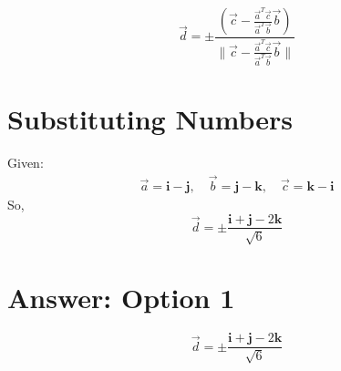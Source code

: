 \documentclass[14pt]{extarticle}
\begin{document}
\begin{equation}
    \vec{d} = \pm \frac{(\vec{c} - \frac{\vec{a}^T \vec{c}}{\vec{a}^T \vec{b}} \vec{b})}{\|\vec{c} - \frac{\vec{a}^T \vec{c}}{\vec{a}^T \vec{b}} \vec{b}\|}
\end{equation}

\section*{Substituting Numbers}

Given:
\begin{align}
\vec{a} = \mathbf{i} - \mathbf{j}, \quad \vec{b} = \mathbf{j} - \mathbf{k}, \quad \vec{c} = \mathbf{k} - \mathbf{i}
\end{align}
So,
\begin{equation}
\vec{d} = \pm \frac{\mathbf{i} + \mathbf{j} - 2\mathbf{k}}{\sqrt{6}}
\end{equation}

\section*{Answer: Option 1}
\[
\boxed{
\vec{d} = \pm \frac{\mathbf{i} + \mathbf{j} - 2\mathbf{k}}{\sqrt{6}}
}
\]
\end{document}

